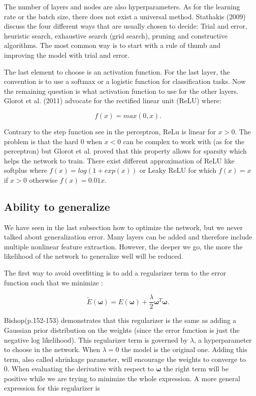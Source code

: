 \documentclass[a4paper,12pt]{article}
\numberwithin{equation}{section}
\begin{document}
The number of layers and nodes are also hyperparameters. As for the learning rate or the batch size, there does not exist a universal method. Stathakis (2009) discuss the four different ways that are usually chosen to decide: Trial and error, heuristic search, exhaustive search (grid search), pruning and constructive algorithms. The most common way is to start with a rule of thumb and improving the model with trial and error. \par
The last element to choose is an activation function. For the last layer, the convention is to use a softmax or a logistic function for classification tasks. Now the remaining question is what activation function to use for the other layers. Glorot et al. (2011) advocate for the rectified linear unit (ReLU) where:

\begin{equation}\label{eq:17}
f(x) = max(0,x).
\end{equation}

Contrary to the step function see in the perceptron, ReLu is linear for $x>0$. The problem is that the hard 0 when $x<0$ can be complex to work with (as for the perceptron) but Glorot et al. proved that this property allows for sparsity which helps the network to train. There exist different approximation of ReLU like softplus where $f(x) = log(1+exp(x))$ or Leaky ReLU for which $f(x) = x $ if $x>0$ otherwise $f(x) = 0.01x$. 

\subsection{Ability to generalize}

We have seen in the last subsection how to optimize the network, but we never talked about generalization error. Many layers can be added and therefore include multiple nonlinear feature extraction. However, the deeper we go, the more the likelihood of the network to generalize well will be reduced.

The first way to avoid overfitting is to add a regularizer term to the error function such that we minimize :

\begin{equation}\label{eq:18}
\widetilde{E}(\boldsymbol{\omega}) = E(\boldsymbol{\omega}) + \frac{\lambda}{2}\boldsymbol{\omega}^T\boldsymbol{\omega}.
\end{equation}

Bishop(p.152-153) demonstrates that this regularizer is the same as adding a Gaussian prior distribution on the weights (since the error function is just the negative log likelihood). This regularizer term is governed by $\lambda$, a hyperparameter to choose in the network. When $\lambda=0$  the model is the original one. Adding this term, also called shrinkage parameter, will encourage the weights to converge to 0. When evaluating the derivative with respect to $\boldsymbol{\omega}$ the right term will be positive while we are trying to minimize the whole expression. A more general expression for this regularizer is 
\end{document}
